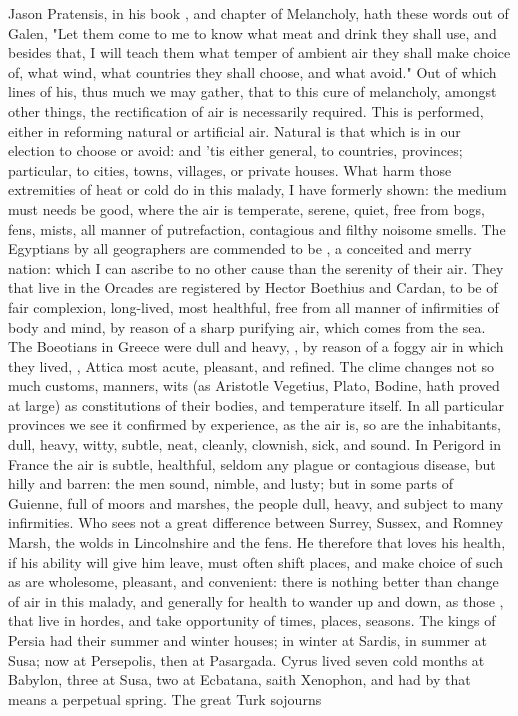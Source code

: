 {Jason Pratensis, in his book , and chapter of Melancholy, hath these words out of Galen, "Let them come to me to know what meat and drink they shall use, and besides that, I will teach them what temper of ambient air they shall make choice of, what wind, what countries they shall choose, and what avoid." Out of which lines of his, thus much we may gather, that to this cure of melancholy, amongst other things, the rectification of air is necessarily required. This is performed, either in reforming natural or artificial air. Natural is that which is in our election to choose or avoid: and 'tis either general, to countries, provinces; particular, to cities, towns, villages, or private houses. What harm those extremities of heat or cold do in this malady, I have formerly shown: the medium must needs be good, where the air is temperate, serene, quiet, free from bogs, fens, mists, all manner of putrefaction, contagious and filthy noisome smells. The Egyptians by all geographers are commended to be , a conceited and merry nation: which I can ascribe to no other cause than the serenity of their air. They that live in the Orcades are registered by Hector Boethius and Cardan, to be of fair complexion, long-lived, most healthful, free from all manner of infirmities of body and mind, by reason of a sharp purifying air, which comes from the sea. The Boeotians in Greece were dull and heavy, , by reason of a foggy air in which they lived, , Attica most acute, pleasant, and refined. The clime changes not so much customs, manners, wits (as Aristotle  Vegetius, Plato, Bodine,  hath proved at large) as constitutions of their bodies, and temperature itself. In all particular provinces we see it confirmed by experience, as the air is, so are the inhabitants, dull, heavy, witty, subtle, neat, cleanly, clownish, sick, and sound. In Perigord in France the air is subtle, healthful, seldom any plague or contagious disease, but hilly and barren: the men sound, nimble, and lusty; but in some parts of Guienne, full of moors and marshes, the people dull, heavy, and subject to many infirmities. Who sees not a great difference between Surrey, Sussex, and Romney Marsh, the wolds in Lincolnshire and the fens. He therefore that loves his health, if his ability will give him leave, must often shift places, and make choice of such as are wholesome, pleasant, and convenient: there is nothing better than change of air in this malady, and generally for health to wander up and down, as those , that live in hordes, and take opportunity of times, places, seasons. The kings of Persia had their summer and winter houses; in winter at Sardis, in summer at Susa; now at Persepolis, then at Pasargada. Cyrus lived seven cold months at Babylon, three at Susa, two at Ecbatana, saith Xenophon, and had by that means a perpetual spring. The great Turk sojourns }
